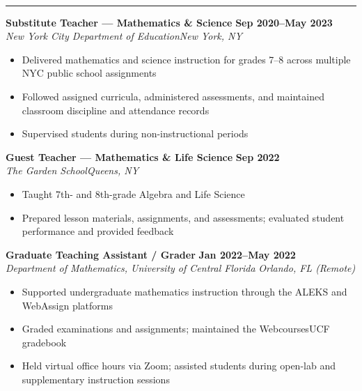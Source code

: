 \documentclass[a4paper, 11pt]{article}
\newcommand{\cvsection}[2]{%
  \vspace{14pt}%
  \noindent#1\enspace{\large\bfseries\MakeUppercase{#2}}\\[-3pt]%
  \rule{\linewidth}{1pt}%
  \vspace{5pt}\par\noindent%
}
\newcommand{\entryvspace}{\vspace{9pt}}
\begin{document}
\cvsection{\faChalkboardTeacher}{Teaching Experience}

\noindent\textbf{Substitute Teacher --- Mathematics \& Science}%
  \hfill\textbf{Sep 2020--May 2023}\\
\textit{New York City Department of Education}\hfill\textit{New York, NY}
\begin{itemize}
  \item Delivered mathematics and science instruction for grades 7--8 across multiple
        NYC public school assignments
  \item Followed assigned curricula, administered assessments, and maintained
        classroom discipline and attendance records
  \item Supervised students during non-instructional periods
\end{itemize}

\entryvspace

\noindent\textbf{Guest Teacher --- Mathematics \& Life Science}%
  \hfill\textbf{Sep 2022}\\
\textit{The Garden School}\hfill\textit{Queens, NY}
\begin{itemize}
  \item Taught 7th- and 8th-grade Algebra and Life Science
  \item Prepared lesson materials, assignments, and assessments; evaluated student
        performance and provided feedback
\end{itemize}

\entryvspace

\noindent\textbf{Graduate Teaching Assistant / Grader}%
  \hfill\textbf{Jan 2022--May 2022}\\
\textit{Department of Mathematics, University of Central Florida}%
  \hfill\textit{Orlando, FL (Remote)}
\begin{itemize}
  \item Supported undergraduate mathematics instruction through the ALEKS and
        WebAssign platforms
  \item Graded examinations and assignments; maintained the WebcoursesUCF gradebook
  \item Held virtual office hours via Zoom; assisted students during open-lab and
        supplementary instruction sessions
\end{itemize}

\entryvspace
\end{document}
